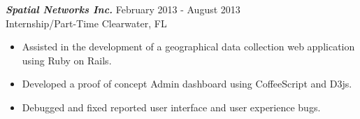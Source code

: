 {\sl \textbf{Spatial Networks Inc.}} \hfill February 2013 - August 2013 \\
Internship/Part-Time \hfill Clearwater, FL
\begin{itemize}
    \item Assisted in the development of a geographical data collection web application using Ruby on Rails.
    \item Developed a proof of concept Admin dashboard using CoffeeScript and D3js.
    \item Debugged and fixed reported user interface and user experience bugs.
\end{itemize}
